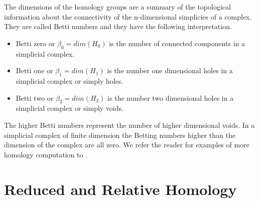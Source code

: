The dimensions of the homology groups are a summary of the topological information about the connectivity of the n-dimensional simplicies of a complex. They are called Betti numbers and they have the following interpretation.

\begin{itemize}
    \item Betti zero or $\beta_0 = dim(H_0)$ is the number of connected components in a simplicial complex.
    \item Betti one  or $\beta_1 = dim(H_1)$ is the number one dimensional holes in a simplicial complex or simply holes.
    \item Betti two  or $\beta_2 = dim(H_2)$ is the number two dimensional holes in a simplicial complex or simply voids.
\end{itemize}

The higher Betti numbers represent the number of higher dimensional voids. In a simplicial complex of finite dimension the Betting numbers higher than the dimension of the complex are all zero. We refer the reader for examples of more homology computation to \cite[p. 88]{comp-topo}.






\section{Reduced and Relative Homology}

